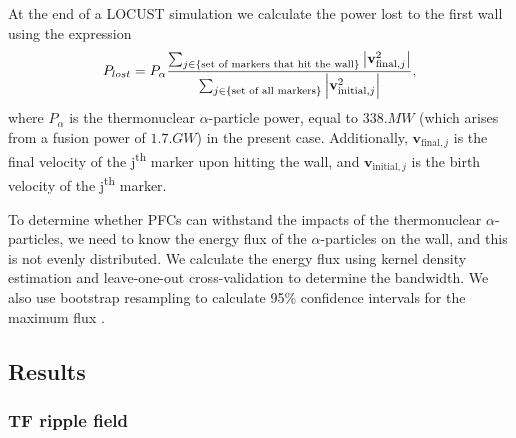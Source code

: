 \documentclass[10pt, a4paper, twoside]{article}
\begin{document}
At the end of a LOCUST simulation we calculate the power lost to the first wall using the expression 
\begin{equation} 
P_{lost} = P_\alpha \frac{\sum_{j\in \text{\{set of markers that hit the wall\}}}\abs{\textbf{v}_{\text{final}, j}^2}}{\sum_{j \in \{\text{set of all markers}\}} \abs{\mathbf{v}_{\text{initial}, j}^2 }}, 
\end{equation}
where $P_\alpha$ is the thermonuclear $\alpha$-particle power, equal to $\si{338.MW}$ (which arises from a fusion power of $1.\si{7.GW}$) in the present case. Additionally, $\mathbf{v}_{\text{final}, j}$ is the final velocity of the j\textsuperscript{th} marker upon hitting the wall, and $\mathbf{v}_{\text{initial}, j}$ is the birth velocity of the j\textsuperscript{th} marker.

To determine whether PFCs can withstand the impacts of the thermonuclear $\alpha$-particles, we need to know the energy flux of the $\alpha$-particles on the wall, and this is not evenly distributed. We calculate the energy flux using kernel density estimation \cite{chen2017} and leave-one-out cross-validation \cite{chen2017} to determine the bandwidth. We also use bootstrap resampling to calculate 95\% confidence intervals for the maximum flux \cite{chen2017}.

\subsection{Results}

\subsubsection{TF ripple field}
\label{sec:tf_ripple_field}
\end{document}
